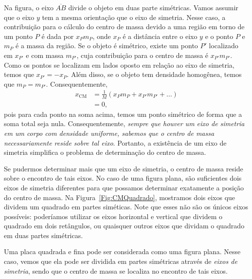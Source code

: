 Na figura, o eixo $\overline{AB}$ divide o objeto em duas parte simétricas. Vamos assumir que o eixo $y$ tem a mesma orientação que o eixo de simetria. Nesse caso, a contribuição para o cálculo do centro de massa devido a uma região em torno de um ponto $P$ é dada por $x_P m_P$, onde $x_P$ é a distância entre o eixo $y$ e o ponto $P$ e $m_P$ é a massa da região. Se o objeto é simétrico, existe um ponto $P'$ localizado em $x_{P'}$ e com massa $m_{P'}$, cuja contribuição para o centro de massa é $x_{P'}m_{P'}$. Como os pontos se localizam em lados oposto em relação ao eixo de simetria, temos que $x_{P'} = - x_P$. Além disso, se o objeto tem densidade homogênea, temos que $m_P = m_{P'}$. Consequentemente,
\begin{align}
  x_\textrm{CM} &= \frac{1}{M} (x_P m_P + x_{P'} m_{P'} + \dots) \\
  &= 0,
\end{align}
%
pois para cada ponto na soma acima, temos um ponto simétrico de forma que a soma total seja nula. Consequentemente, \emph{sempre que houver um eixo de simetria em um corpo com densidade uniforme, sabemos que o centro de massa necessariamente reside sobre tal eixo}. Portanto, a existência de um eixo de simetria simplifica o problema de determinação do centro de massa.

Se pudermos determinar mais que um eixo de simetria, o centro de massa reside sobre o encontro de tais eixos. No caso de uma figura plana, são suficientes dois eixos de simetria diferentes para que possamos determinar exatamente a posição do centro de massa. Na Figura~\ref{Fig:CMQuadrado}, mostramos dois eixos que dividem um quadrado em partes siméticas. Note que esses não são os únicos eixos possíveis: poderíamos utilizar os eixos horizontal e vertical que dividem o quadrado em dois retângulos, ou quaisquer outros eixos que dividam o quadrado em duas partes simétricas.
\begin{marginfigure}[-2cm]
\centering
{}
\caption{Uma placa quadrada e fina pode ser considerada como uma figura plana. Nesse caso, vemos que ela pode ser dividida em partes simétricas através de \emph{eixos de simetria}, sendo que o centro de massa se localiza no encontro de tais eixos. \label{Fig:CMQuadrado}}
\end{marginfigure}


